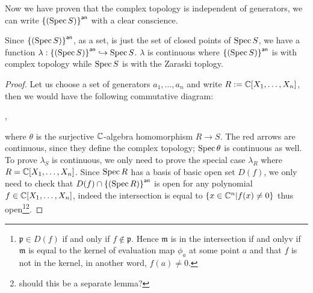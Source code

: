 Now we have proven that the complex topology is independent of generators, we can write ${\left\{{\left(\operatorname{Spec} S\right)}\right\}}^{\mathsf{an}}$ with a clear conscience.

\begin{lemma} Since ${\left\{{\left(\operatorname{Spec} S\right)}\right\}}^{\mathsf{an}}$, as a set, is just the set of closed points of $\operatorname{Spec} S$, we have a function $\lambda: {\left\{{\left(\operatorname{Spec} S\right)}\right\}}^{\mathsf{an}} \hookrightarrow \operatorname{Spec} S$. $\lambda$ is continuous where ${\left\{{\left(\operatorname{Spec} S\right)}\right\}}^{\mathsf{an}}$ is with complex topology while $\operatorname{Spec} S$ is with the Zaraski toplogy.\label{thm:continuous-inclusion-complex-topology-affine}
\end{lemma}

\begin{proof}
	Let us choose a set of generators $a_{1},\dots, a_{n}$ and write $R := \mathbb{C}[X_{1},\dots, X_{n}]$, then we would have the following commutative diagram:

	\begin{center}
		,
	\end{center}
	where $\theta$ is the surjective $\mathbb{C}$-algebra homomorphism $R \to S$.
	The red arrows are continuous, since they define the complex topology; $\operatorname{Spec} \theta$ is continuous as well. To prove $\lambda_{S}$ is continuous, we only need to prove the special case $\lambda_{R}$ where $R = \mathbb{C}[X_{1},\dots, X_{n}]$. Since $\operatorname{Spec} R$ has a basis of basic open set $D(f)$, we only need to check that $D(f) \cap {\left\{{\left(\ensuremath{\operatorname{Spec}}R\right)}\right\}}^{\mathsf{an}}$ is open for any polynomial $f \in \mathbb{C}[X_{1}, \dots, X_{n}]$, indeed the intersection is equal to $\{x \in \mathbb{C}^{n}| f(x) \ne 0 \}$ thus open\footnote{$\mathfrak{p} \in D(f)$ if and only if $f \not\in \mathfrak{p}$. Hence $\mathfrak{m}$ is in the intersection if and onlyv if $\mathfrak{m}$ is equal to the kernel of evaluation map $\phi_{a}$ at some point $a$ and that $f$ is not in the kernel, in another word, $f(a) \ne 0$.}\footnote{should this be a separate lemma?}. %

\end{proof}

